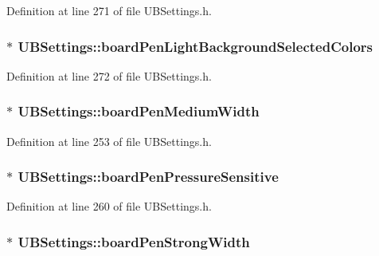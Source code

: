 Definition at line 271 of file U\-B\-Settings.\-h.

\hypertarget{class_u_b_settings_a7875b1ae8bfd70fa0a0f695eb5e8b8f9}{
\subsubsection[{board\-Pen\-Light\-Background\-Selected\-Colors}]{$\ast$ U\-B\-Settings\-::board\-Pen\-Light\-Background\-Selected\-Colors}}\label{db/d66/class_u_b_settings_a7875b1ae8bfd70fa0a0f695eb5e8b8f9}


Definition at line 272 of file U\-B\-Settings.\-h.

\hypertarget{class_u_b_settings_a56812af7a16f6ad2bf07ffebe2af7aba}{
\subsubsection[{board\-Pen\-Medium\-Width}]{$\ast$ U\-B\-Settings\-::board\-Pen\-Medium\-Width}}\label{db/d66/class_u_b_settings_a56812af7a16f6ad2bf07ffebe2af7aba}


Definition at line 253 of file U\-B\-Settings.\-h.

\hypertarget{class_u_b_settings_a9d839d72ab401185bb7cd41ee27a7823}{
\subsubsection[{board\-Pen\-Pressure\-Sensitive}]{$\ast$ U\-B\-Settings\-::board\-Pen\-Pressure\-Sensitive}}\label{db/d66/class_u_b_settings_a9d839d72ab401185bb7cd41ee27a7823}


Definition at line 260 of file U\-B\-Settings.\-h.

\hypertarget{class_u_b_settings_aa1d3e7cc36f9e9f5391b8149edc5ef8d}{
\subsubsection[{board\-Pen\-Strong\-Width}]{$\ast$ U\-B\-Settings\-::board\-Pen\-Strong\-Width}}\label{db/d66/class_u_b_settings_aa1d3e7cc36f9e9f5391b8149edc5ef8d}


